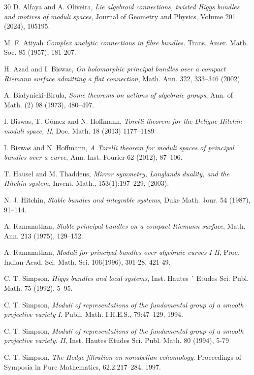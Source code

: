 \documentclass[11pt, reqno]{amsart}
\numberwithin{equation}{section}
\theoremstyle{definition}
\begin{document}
\begin{thebibliography}{30}
	   D. Alfaya and A. Oliveira,
	   \emph{Lie algebroid connections, twisted Higgs bundles and motives of moduli spaces}, Journal of Geometry and Physics, Volume 201 (2024), 105195.
		

		M. F. Atiyah
		\emph{Complex analytic connections in fibre bundles.} Trans. Amer. Math. Soc. 85 (1957), 181-207.
		
		H. Azad and I. Biswas,
		\emph{On holomorphic principal bundles over a compact
			Riemann surface admitting a flat connection}, Math. Ann. 322, 333–346 (2002)

A. Białynicki-Birula,
\emph{Some theorems on actions of algebraic groups},
Ann. of Math. (2) 98 (1973), 480–497.
		
		I. Biswas, T. Gómez and N. Hoffmann, 
		\emph{Torelli theorem for the Deligne-Hitchin moduli space, II}, Doc. Math. 18 (2013) 1177–1189
		
		 I. Biswas and N. Hoffmann, 
		 \emph{A Torelli theorem for moduli spaces of
principal bundles over a curve}, Ann. Inst. Fourier 62 (2012), 87–106.






	 T. Hausel and M. Thaddeus, 
	 \emph{Mirror symmetry, Langlands duality, and the Hitchin system}.
Invent. Math., 153(1):197–229, (2003).
	  

	   

    

 N. J. Hitchin, 
 \emph{Stable bundles and integrable systems}, Duke Math. Jour.
54 (1987), 91–114.

 A. Ramanathan, 
 \emph{Stable principal bundles on a compact Riemann surface}, Math. Ann. 213 (1975), 129–152.



 A. Ramanathan,
 \emph{Moduli for principal bundles over algebraic curves I-II}, Proc. Indian Acad. Sci. Math. Sci. 106(1996), 301-28, 421-49.

 C. T. Simpson, 
 \emph{Higgs bundles and local systems}, Inst. Hautes ´ Etudes
Sci. Publ. Math. 75 (1992), 5–95.

      C. T. Simpson, 
      \emph{Moduli of representations of the fundamental group of a smooth projective variety I}. Publi. Math. I.H.E.S., 79:47–129, 1994.
 
C. T. Simpson,
\emph{Moduli of representations of the fundamental group of a smooth projective variety. II}, Inst. Hautes Etudes Sci. Publ. Math. 80 (1994), 5-79

	  
	  C. T. Simpson, 
	  \emph{The Hodge filtration on nonabelian cohomology}. Proceedings of Symposia in Pure Mathematics, 62.2:217–284, 1997.

    
	   
	   

	   
	   	
           
		
		



\end{thebibliography}
	
\end{document}

